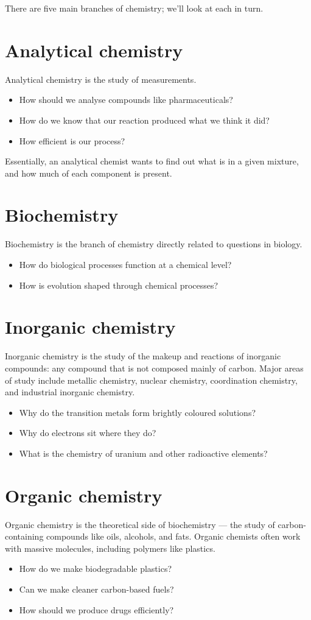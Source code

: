 \documentclass[a4paper]{memoir}
\begin{document}
There are five main branches of chemistry; we'll look at each in turn.

\section{Analytical chemistry}
Analytical chemistry is the study of measurements.
\begin{itemize}
  \item How should we analyse compounds like pharmaceuticals?
  \item How do we know that our reaction produced what we think it did?
  \item How efficient is our process?
\end{itemize}
Essentially, an analytical chemist wants to find out what is in a given mixture, and how much of each component is present.

\section{Biochemistry}
Biochemistry is the branch of chemistry directly related to questions in biology.
\begin{itemize}
  \item How do biological processes function at a chemical level?
  \item How is evolution shaped through chemical processes?
\end{itemize}

\section{Inorganic chemistry}
Inorganic chemistry is the study of the makeup and reactions of inorganic compounds: any compound that is not composed mainly of carbon. Major
areas of study include metallic chemistry, nuclear chemistry, coordination chemistry, and industrial inorganic chemistry.
\begin{itemize}
  \item Why do the transition metals form brightly coloured solutions?
  \item Why do electrons sit where they do?
  \item What is the chemistry of uranium and other radioactive elements?
\end{itemize}

\section{Organic chemistry}
Organic chemistry is the theoretical side of biochemistry --- the study of carbon-containing compounds like oils, alcohols, and fats. Organic
chemists often work with massive molecules, including polymers like plastics.
\begin{itemize}
  \item How do we make biodegradable plastics?
  \item Can we make cleaner carbon-based fuels?
  \item How should we produce drugs efficiently?
\end{itemize}
\end{document}
